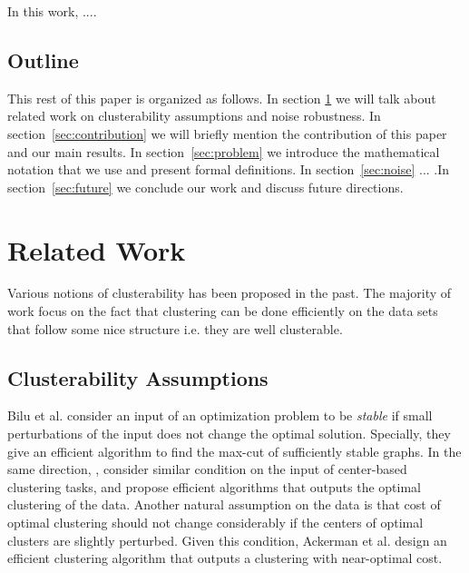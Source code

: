 \documentclass[twoside]{article}
\begin{document}
In this work, ....

\subsection{Outline}
This rest of this paper is organized as follows. In section \ref{sec:previous} we will talk about related work on clusterability assumptions and noise robustness. In section~\ref{sec:contribution} we will briefly mention the contribution of this paper and our main results. In section~\ref{sec:problem} we introduce the mathematical notation that we use and present formal definitions. In section~\ref{sec:noise} ... .In section~\ref{sec:future} we conclude our work and discuss future directions.
\section{Related Work}
\label{sec:previous}

Various notions of clusterability has been proposed in the past. The majority of work focus on the fact that clustering can be done efficiently on the data sets that follow some nice structure i.e. they are well clusterable.

\subsection{Clusterability Assumptions}


Bilu et al. \cite{bilu2012stable} consider an input of an optimization problem to be \emph{stable} if small perturbations of the input does not change the optimal solution. Specially, they give an efficient algorithm to find the max-cut of sufficiently stable graphs.
In the same direction, \cite{awasthi2012center, balcan2012clustering}, consider similar condition on the input of center-based clustering tasks, and propose efficient algorithms that outputs the optimal clustering of the data. Another natural assumption \cite{ackerman2009clusterability} on the data is that cost of optimal clustering should not change considerably if the centers of optimal clusters are slightly perturbed. Given this condition, Ackerman et al. design an efficient clustering algorithm that outputs a clustering with near-optimal cost. 
\end{document}
